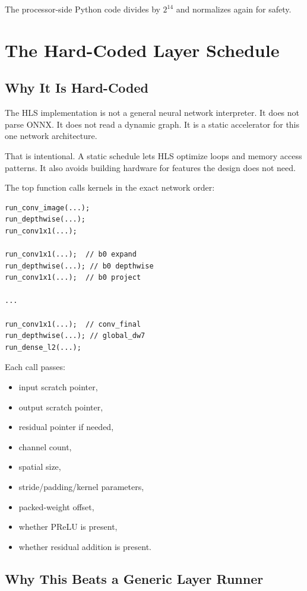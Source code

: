 \documentclass[11pt]{article}
\begin{document}
The processor-side Python code divides by \(2^{14}\) and normalizes again for safety.

\section{The Hard-Coded Layer Schedule}

\subsection{Why It Is Hard-Coded}

The HLS implementation is not a general neural network interpreter.
It does not parse ONNX.
It does not read a dynamic graph.
It is a static accelerator for this one network architecture.

That is intentional.
A static schedule lets HLS optimize loops and memory access patterns.
It also avoids building hardware for features the design does not need.

The top function calls kernels in the exact network order:

\begin{lstlisting}
run_conv_image(...);
run_depthwise(...);
run_conv1x1(...);

run_conv1x1(...);  // b0 expand
run_depthwise(...); // b0 depthwise
run_conv1x1(...);  // b0 project

...

run_conv1x1(...);  // conv_final
run_depthwise(...); // global_dw7
run_dense_l2(...);
\end{lstlisting}

Each call passes:

\begin{itemize}[leftmargin=1.4em]
  \item input scratch pointer,
  \item output scratch pointer,
  \item residual pointer if needed,
  \item channel count,
  \item spatial size,
  \item stride/padding/kernel parameters,
  \item packed-weight offset,
  \item whether PReLU is present,
  \item whether residual addition is present.
\end{itemize}

\subsection{Why This Beats a Generic Layer Runner}
\end{document}
